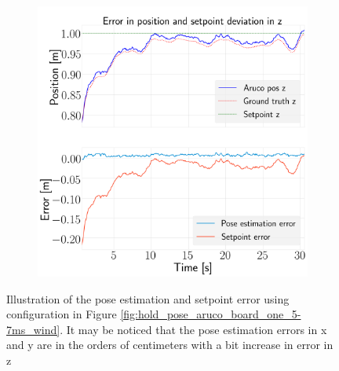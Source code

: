 \documentclass[../Head/report.tex]{subfiles}
\begin{document}
\begin{figure}[H]
\begin{subfigure}[t]{.30\textwidth}
        \caption{}
        \label{fig:optitrack_hold_pose_using_estimated_aruco_pose_error_y_test_five}
    \end{subfigure}
     \hspace{0.2em}
    \begin{subfigure}[t]{.30\textwidth}
        \centering
        \includegraphics[width=\textwidth]{../Figures/optitrack/hold_pose_using_estimated_aruco_pose/pose_error_z_test5.png}
        \caption{}
        \label{fig:optitrack_hold_pose_using_estimated_aruco_pose_error_z_test_five}
    \end{subfigure}
    \caption{Illustration of the pose estimation and setpoint error using configuration in Figure \ref{fig:hold_pose_aruco_board_one_5-7ms_wind}. It may be noticed that the pose estimation errors in x and y are in the orders of centimeters with a bit increase in error in z}
    \label{fig:optitrack_hold_pose_using_estimated_aruco_pose_error_pos_test_five}
\end{figure}
\end{document}
